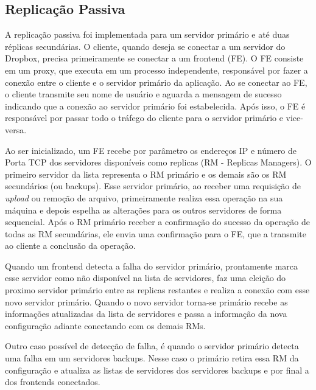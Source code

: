 \documentclass[a4paper]{article}
\begin{document}
\subsection{Replicação Passiva}
A replicação passiva foi implementada para um servidor primário e até duas réplicas secundárias. O cliente, quando deseja se conectar a um servidor do Dropbox, precisa primeiramente se conectar a um frontend (FE). O FE consiste em um proxy, que executa em um processo independente, responsável por fazer a conexão entre o cliente e o servidor primário da aplicação. Ao se conectar ao FE, o cliente transmite seu nome de usuário e aguarda a mensagem de sucesso indicando que a conexão ao servidor primário foi estabelecida. Após isso, o FE é responsável por passar todo o tráfego do cliente para o servidor primário e vice-versa.

Ao ser inicializado, um FE recebe por parâmetro os endereços IP e número de Porta TCP dos servidores disponíveis como replicas (RM - Replicas Managers). O primeiro servidor da lista representa o RM primário e os demais são os RM secundários (ou backups). Esse servidor primário, ao receber uma requisição de \textit{upload} ou remoção de arquivo, primeiramente realiza essa operação na sua máquina e depois espelha as alterações para os outros servidores de forma sequencial. Após o RM primário receber a confirmação do sucesso da operação de todas as RM secundárias, ele envia uma confirmação para o FE, que a transmite ao cliente a conclusão da operação.

Quando um frontend detecta a falha do servidor primário, prontamente marca esse servidor como não disponível na lista de servidores, faz uma eleição do proximo servidor primário entre as replicas restantes e realiza a conexão com esse novo servidor primário. Quando o novo servidor torna-se primário recebe as informações atualizadas da lista de servidores e passa a informação da nova configuração adiante conectando com os demais RMs.


Outro caso possível de detecção de falha, é quando o servidor primário detecta uma falha em um servidores backups. Nesse caso o primário retira essa RM da configuração e atualiza as listas de servidores dos servidores backups e por final a dos frontends conectados.
\end{document}
